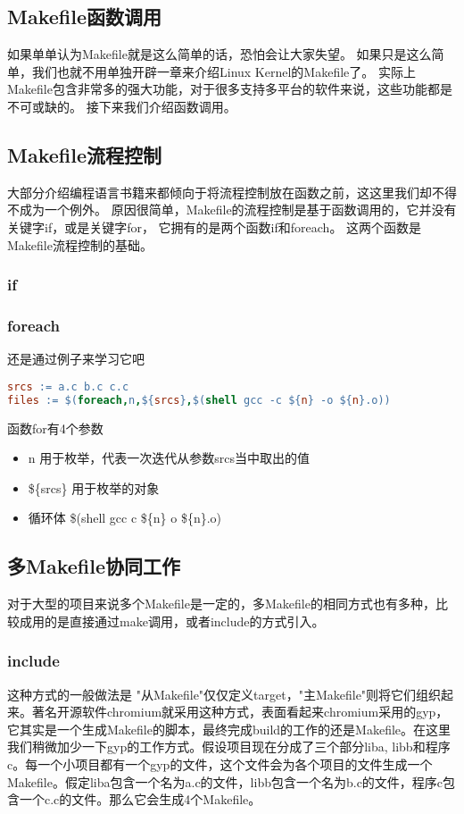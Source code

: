 \subsection{Makefile函数调用}
如果单单认为Makefile就是这么简单的话，恐怕会让大家失望。
如果只是这么简单，我们也就不用单独开辟一章来介绍Linux Kernel的Makefile了。
实际上Makefile包含非常多的强大功能，对于很多支持多平台的软件来说，这些功能都是不可或缺的。
接下来我们介绍函数调用。
\subsection{Makefile流程控制}
大部分介绍编程语言书籍来都倾向于将流程控制放在函数之前，这这里我们却不得不成为一个例外。
原因很简单，Makefile的流程控制是基于函数调用的，它并没有关键字if，或是关键字for，
它拥有的是两个函数if和foreach。
这两个函数是Makefile流程控制的基础。
\subsubsection{if}
\subsubsection{foreach}
还是通过例子来学习它吧
\begin{lstlisting}[language=make]
srcs := a.c b.c c.c
files := $(foreach,n,${srcs},$(shell gcc -c ${n} -o ${n}.o))
\end{lstlisting}
函数for有4个参数
\begin{itemize}
\item n 用于枚举，代表一次迭代从参数srcs当中取出的值
\item \$\{srcs\} 用于枚举的对象
\item 循环体 \$(shell gcc \-c \$\{n\} \-o \$\{n\}.o) 
\end{itemize}

\subsection{多Makefile协同工作}
对于大型的项目来说多个Makefile是一定的，多Makefile的相同方式也有多种，比较成用的是直接通过make调用，或者include的方式引入。
\subsubsection{include}
这种方式的一般做法是 "从Makefile"仅仅定义target，"主Makefile"则将它们组织起来。著名开源软件chromium就采用这种方式，表面看起来chromium采用的gyp，它其实是一个生成Makefile的脚本，最终完成build的工作的还是Makefile。在这里我们稍微加少一下gyp的工作方式。假设项目现在分成了三个部分liba, libb和程序c。每一个小项目都有一个gyp的文件，这个文件会为各个项目的文件生成一个Makefile。假定liba包含一个名为a.c的文件，libb包含一个名为b.c的文件，程序c包含一个c.c的文件。那么它会生成4个Makefile。

